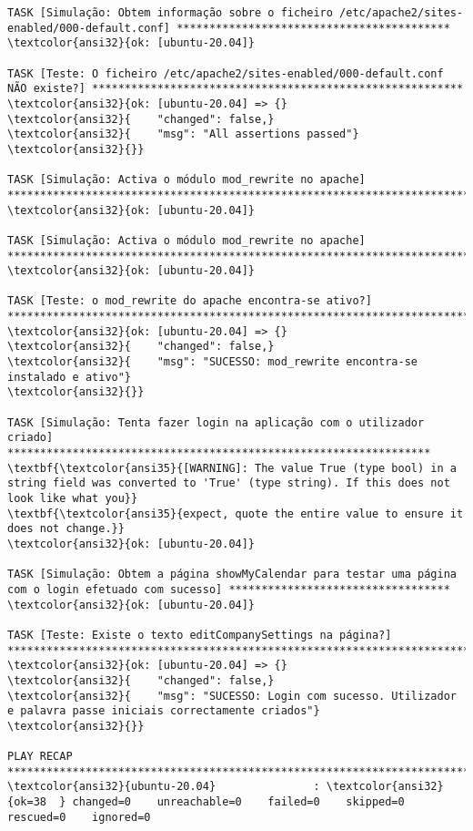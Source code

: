 \documentclass{scrartcl}
\begin{document}
\begin{Verbatim}
TASK [Simulação: Obtem informação sobre o ficheiro /etc/apache2/sites-enabled/000-default.conf] ******************************************
\textcolor{ansi32}{ok: [ubuntu-20.04]}

TASK [Teste: O ficheiro /etc/apache2/sites-enabled/000-default.conf NÃO existe?] *********************************************************
\textcolor{ansi32}{ok: [ubuntu-20.04] => {}
\textcolor{ansi32}{    "changed": false,}
\textcolor{ansi32}{    "msg": "All assertions passed"}
\textcolor{ansi32}{}}

TASK [Simulação: Activa o módulo mod_rewrite no apache] **********************************************************************************
\textcolor{ansi32}{ok: [ubuntu-20.04]}

TASK [Simulação: Activa o módulo mod_rewrite no apache] **********************************************************************************
\textcolor{ansi32}{ok: [ubuntu-20.04]}

TASK [Teste: o mod_rewrite do apache encontra-se ativo?] *********************************************************************************
\textcolor{ansi32}{ok: [ubuntu-20.04] => {}
\textcolor{ansi32}{    "changed": false,}
\textcolor{ansi32}{    "msg": "SUCESSO: mod_rewrite encontra-se instalado e ativo"}
\textcolor{ansi32}{}}

TASK [Simulação: Tenta fazer login na aplicação com o utilizador criado] *****************************************************************
\textbf{\textcolor{ansi35}{[WARNING]: The value True (type bool) in a string field was converted to 'True' (type string). If this does not look like what you}}
\textbf{\textcolor{ansi35}{expect, quote the entire value to ensure it does not change.}}
\textcolor{ansi32}{ok: [ubuntu-20.04]}

TASK [Simulação: Obtem a página showMyCalendar para testar uma página com o login efetuado com sucesso] **********************************
\textcolor{ansi32}{ok: [ubuntu-20.04]}

TASK [Teste: Existe o texto editCompanySettings na página?] ******************************************************************************
\textcolor{ansi32}{ok: [ubuntu-20.04] => {}
\textcolor{ansi32}{    "changed": false,}
\textcolor{ansi32}{    "msg": "SUCESSO: Login com sucesso. Utilizador e palavra passe iniciais correctamente criados"}
\textcolor{ansi32}{}}

PLAY RECAP *******************************************************************************************************************************
\textcolor{ansi32}{ubuntu-20.04}               : \textcolor{ansi32}{ok=38  } changed=0    unreachable=0    failed=0    skipped=0    rescued=0    ignored=0



\end{Verbatim}
\end{document}
